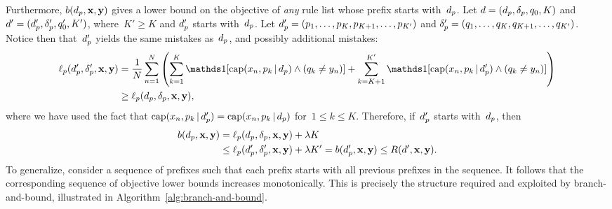 Furthermore, $b(d_p, \mathbf{x}, \mathbf{y})$ gives a lower bound on the objective of
\emph{any} rule list whose prefix starts with~$d_p$.
%
Let ${{d} = (d_p, \delta_p, q_0, K)}$ and ${{d}' = (d_p', \delta_p', q_0', K')}$,
where~${K' \ge K}$ and $d_p'$ starts with~$d_p$.
%
Let ${d_p' = (p_1, \dots, p_K, p_{K+1}, \dots, p_{K'})}$
and ${\delta_p' = (q_1, \dots, q_K, q_{K+1}, \dots, q_{K'})}$.
%
Notice then that~$d_p'$ yields the same mistakes as~$d_p$,
and possibly additional mistakes:
\begin{align}
\Loss_p(\Prefix', \Labels', \x, \y)
&= \frac{1}{N} \sum_{n=1}^N \left( \sum_{k=1}^K \one [ \Cap(x_n, p_k \given \Prefix) \wedge (q_k \neq y_n) ]
+ \sum_{k=K+1}^{K'} \one [ \Cap(x_n, p_k \given \Prefix') \wedge (q_k \neq y_n) ] \right) \nn \\
&\ge \Loss_p(\Prefix, \Labels, \x, \y),
\end{align}
where we have used the fact that
${\text{cap}(x_n, p_k \,|\, d_p') = \text{cap}(x_n, p_k \,|\, d_p)}$
for~${1 \le k \le K}$.
%
Therefore, if~$d_p'$ starts with~$d_p$, then
\begin{align}
b(\Prefix, \x, \y) &= \Loss_p(\Prefix, \Labels, \x, \y) + \Reg K \nn \\
&\le  \Loss_p(\Prefix', \Labels', \x, \y) + \Reg K' = b(\Prefix', \x, \y)
\le \Obj(\RL', \x, \y).
\label{eq:prefix-lb}
\end{align}
%
To generalize, consider a sequence of prefixes such that each prefix
starts with all previous prefixes in the sequence.
%
It follows that the corresponding sequence of objective lower bounds
increases monotonically.
%
This is precisely the structure required and exploited by branch-and-bound,
illustrated in Algorithm~\ref{alg:branch-and-bound}.

